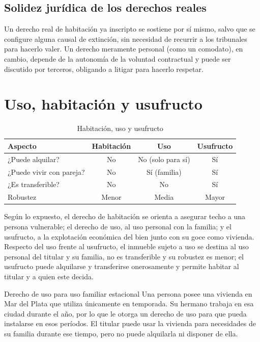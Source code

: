 \documentclass[12pt,oneside]{book}
\begin{document}
\subsection{Solidez jurídica de los derechos reales}

Un derecho real de habitación ya inscripto se sostiene por sí mismo, salvo que se configure alguna causal de extinción, sin necesidad de recurrir a los tribunales para hacerlo valer. Un derecho meramente personal (como un comodato), en cambio, depende de la autonomía de la voluntad contractual y puede ser discutido por terceros, obligando a litigar para hacerlo respetar.

\section{Uso, habitación y usufructo}

\begin{table}[H]
\centering
\caption{Habitación, uso y usufructo}
\renewcommand{\arraystretch}{1.2}
\begin{tabularx}{\textwidth}{>{\raggedright\arraybackslash}X c c c}
\toprule
\textbf{Aspecto} & \textbf{Habitación} & \textbf{Uso} & \textbf{Usufructo} \\
\midrule
¿Puede alquilar? & No & No (solo para sí) & Sí \\
¿Puede vivir con pareja? & No & Sí (familia) & Sí \\
¿Es transferible? & No & No & Sí \\
Robustez & Menor & Media & Mayor \\
\bottomrule
\end{tabularx}
\end{table}

Según lo expuesto, el derecho de habitación se orienta a asegurar techo a una persona vulnerable; el derecho de uso, al uso personal con la familia; y el usufructo, a la explotación económica del bien junto con su goce como vivienda. Respecto del uso frente al usufructo, el inmueble sujeto a uso se destina al uso personal del titular y su familia, no es transferible y su robustez es menor; el usufructo puede alquilarse y transferirse onerosamente y permite habitar al titular y a quien este decida.

\begin{example}{Derecho de uso para uso familiar estacional}
Una persona posee una vivienda en Mar del Plata que utiliza únicamente en temporada. Su hermano trabaja en esa ciudad durante el año, por lo que le otorga un derecho de uso para que pueda instalarse en esos períodos. El titular puede usar la vivienda para necesidades de su familia durante ese tiempo, pero no puede alquilarla ni disponer de ella.
\end{example}
\end{document}
